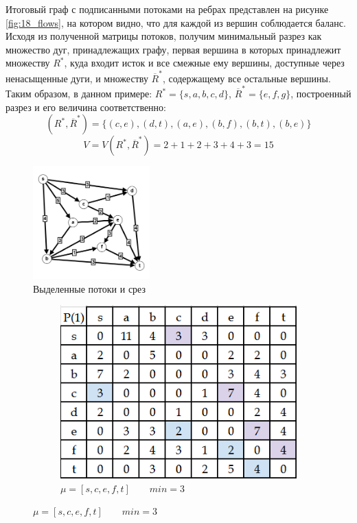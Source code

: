 \documentclass{article}
\begin{document}
\begin{enumerate}
Итоговый граф с подписанными потоками на ребрах представлен на рисунке \ref{fig:18_flows}, на котором видно, что для каждой из вершин соблюдается баланс.
Исходя из полученной матрицы потоков, получим минимальный разрез как множество дуг, принадлежащих графу, первая вершина в которых принадлежит множеству $R^*$, куда входит исток и все смежные ему  вершины, доступные через ненасыщенные дуги, и множеству $\overline{R}^*$, содержащему все остальные вершины.
Таким образом, в данном примере: 
$R^* = \{s, a, b, c, d\}$, $\overline{R}^* = \{e, f, g\}$, построенный разрез и его величина соответственно:
$$(R^*,\overline{R}^*)=\{(c,e),(d,t),(a,e),(b,f),(b,t),(b,e)\}$$
$$V=V(R^*,\overline{R}^*)=2+1+2+3+4+3=15$$
\begin{figure}[ht]
    \includegraphics[width=0.4\textwidth, center]{attachments/16/flows.png}
    \caption{Выделенные потоки и срез}
    \label{fig:16_res}
\end{figure}
\begin{figure}
     \centering
     \begin{subfigure}[t]{0.3\textwidth}
         \centering
         \caption*{\small{$\mu = [s, c, e, f, t] \qquad min = 3$}}
         \includegraphics[width=\textwidth]{attachments/16/1.png}

\end{subfigure}
\end{figure}
\end{enumerate}
\end{document}
